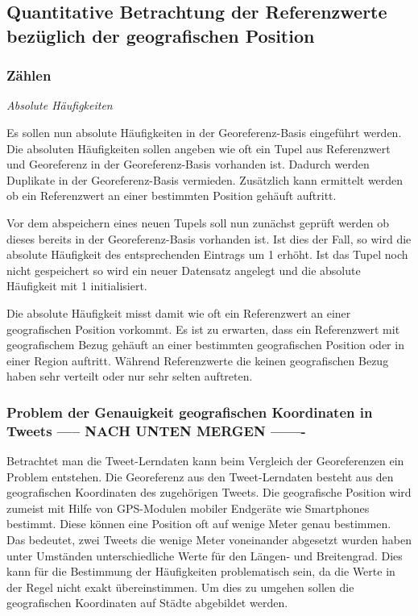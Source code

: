 		\subsection{Quantitative Betrachtung der Referenzwerte bezüglich der geografischen Position}


			\subsubsection{Zählen}

				\textit{Absolute Häufigkeiten}

					Es sollen nun absolute Häufigkeiten in der Georeferenz-Basis eingeführt werden.
					Die absoluten Häufigkeiten sollen angeben wie oft ein Tupel aus Referenzwert und Georeferenz in der Georeferenz-Basis vorhanden ist.
					Dadurch werden Duplikate in der Georeferenz-Basis vermieden.
					Zusätzlich kann ermittelt werden ob ein Referenzwert an einer bestimmten Position gehäuft auftritt.

					Vor dem abspeichern eines neuen Tupels soll nun zunächst geprüft werden ob dieses bereits in der Georeferenz-Basis vorhanden ist. 
					Ist dies der Fall, so wird die absolute Häufigkeit des entsprechenden Eintrags um 1 erhöht.
					Ist das Tupel noch nicht gespeichert so wird ein neuer Datensatz angelegt und die absolute Häufigkeit mit 1 initialisiert.

					Die absolute Häufigkeit misst damit wie oft ein Referenzwert an einer geografischen Position vorkommt.
					Es ist zu erwarten, dass ein Referenzwert mit geografischem Bezug gehäuft an einer bestimmten geografischen Position oder in einer Region auftritt.
					Während Referenzwerte die keinen geografischen Bezug haben sehr verteilt oder nur sehr selten auftreten. 

			\subsubsection{Problem der Genauigkeit geografischen Koordinaten in Tweets ----- NACH UNTEN MERGEN -------}  

				Betrachtet man die Tweet-Lerndaten kann beim Vergleich der Georeferenzen ein Problem entstehen.
				Die Georeferenz aus den Tweet-Lerndaten besteht aus den geografischen Koordinaten des zugehörigen Tweets.
				Die geografische Position wird zumeist mit Hilfe von GPS-Modulen mobiler Endgeräte wie Smartphones bestimmt. 
				Diese können eine Position oft auf wenige Meter genau bestimmen.
				Das bedeutet, zwei Tweets die wenige Meter voneinander abgesetzt wurden haben unter Umständen unterschiedliche Werte für den Längen- und Breitengrad.
				Dies kann für die Bestimmung der Häufigkeiten problematisch sein, da die Werte in der Regel nicht exakt übereinstimmen.
				Um dies zu umgehen sollen die geografischen Koordinaten auf Städte abgebildet werden.

